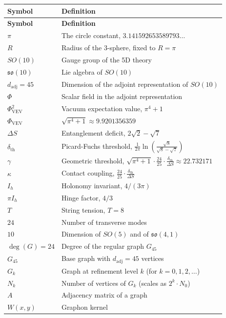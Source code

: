 \documentclass[12pt]{article}
\numberwithin{equation}{section}
\newcommand{\VEV}{\Phi_{\mathrm{VEV}}}
\newcommand{\dth}{\delta_{\mathrm{th}}}
\newcommand{\DS}{\Delta S}
\newcommand{\SphereR}{R}
\begin{document}
\begin{longtable}{p{} p{}}
\hline
\textbf{Symbol} & \textbf{Definition} \\
\hline
\endfirsthead
\hline
\textbf{Symbol} & \textbf{Definition} \\
\hline
\endhead
\hline
\endfoot
\(\pi\) & The circle constant, \(3.141592653589793\ldots\) \\
\(\SphereR\) & Radius of the 3-sphere, fixed to \(\SphereR = \pi\) \\
\(SO(10)\) & Gauge group of the 5D theory \\
\(\mathfrak{so}(10)\) & Lie algebra of \(SO(10)\) \\
\(d_{\text{adj}} = 45\) & Dimension of the adjoint representation of \(SO(10)\) \\
\(\Phi\) & Scalar field in the adjoint representation \\
\(\VEV^2\) & Vacuum expectation value, \(\pi^4 + 1\) \\
\(\VEV\) & \(\sqrt{\pi^4 + 1} \approx 9.9201356359\) \\
\(\DS\) & Entanglement deficit, \(2\sqrt{2} - \sqrt{7}\) \\
\(\dth\) & Picard-Fuchs threshold, \(\frac{1}{2\pi} \ln\left( \frac{\sqrt{8}}{\sqrt{8} - \sqrt{7}} \right)\) \\
\(\gamma\) & Geometric threshold, \(\sqrt{\pi^4+1} \cdot \frac{24}{25} \cdot \frac{\dth}{\DS} \approx 22.732171\) \\
\(\kappa\) & Contact coupling, \(\frac{24}{25} \cdot \frac{\dth}{\DS}\) \\
\(I_h\) & Holonomy invariant, \(4/(3\pi)\) \\
\(\pi I_h\) & Hinge factor, \(4/3\) \\
\(T\) & String tension, \(T = 8\) \\
\(24\) & Number of transverse modes \\
\(10\) & Dimension of \(SO(5)\) and of \(\mathfrak{so}(4,1)\) \\
\(\deg(G) = 24\) & Degree of the regular graph \(G_{45}\) \\
\(G_{45}\) & Base graph with \(d_{\text{adj}} = 45\) vertices \\
\(G_k\) & Graph at refinement level \(k\) (for \(k = 0,1,2,\dots\)) \\
\(N_k\) & Number of vertices of \(G_k\) (scales as \(2^k \cdot N_0\)) \\
\(A\) & Adjacency matrix of a graph \\
\(W(x,y)\) & Graphon kernel \\

\end{longtable}
\end{document}
